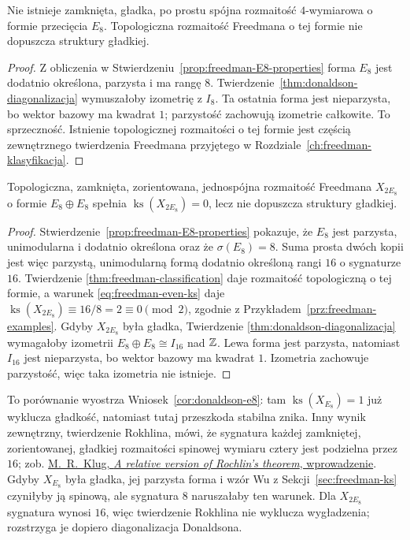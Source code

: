 \begin{wniosek}
\label{cor:donaldson-e8}
Nie istnieje zamknięta, gładka, po prostu spójna
rozmaitość $4$-wymiarowa o formie przecięcia $E_8$.
Topologiczna rozmaitość Freedmana o tej formie
nie dopuszcza struktury gładkiej.
\end{wniosek}
\begin{proof}
Z obliczenia w
Stwierdzeniu~\ref{prop:freedman-E8-properties} forma
$E_8$ jest dodatnio określona, parzysta i ma rangę $8$.
Twierdzenie~\ref{thm:donaldson-diagonalizacja}
wymuszałoby izometrię z $I_8$. Ta ostatnia forma
jest nieparzysta, bo wektor bazowy ma kwadrat $1$;
parzystość zachowują izometrie całkowite. To sprzeczność.
Istnienie topologicznej rozmaitości o tej formie jest
częścią zewnętrznego twierdzenia Freedmana przyjętego
w Rozdziale~\ref{ch:freedman-klasyfikacja}.
\end{proof}

\begin{wniosek}
\label{cor:donaldson-2e8}
Topologiczna, zamknięta, zorientowana, jednospójna
rozmaitość Freedmana $X_{2E_8}$ o formie
$E_8\oplus E_8$ spełnia $\operatorname{ks}(X_{2E_8})=0$,
lecz nie dopuszcza struktury gładkiej.
\end{wniosek}
\begin{proof}
Stwierdzenie~\ref{prop:freedman-E8-properties}
pokazuje, że $E_8$ jest parzysta, unimodularna
i dodatnio określona oraz że $\sigma(E_8)=8$.
Suma prosta dwóch kopii jest więc parzystą,
unimodularną formą dodatnio określoną rangi $16$
o sygnaturze $16$. Twierdzenie
\ref{thm:freedman-classification} daje rozmaitość
topologiczną o tej formie, a warunek
\eqref{eq:freedman-even-ks} daje
$\operatorname{ks}(X_{2E_8})\equiv16/8=2\equiv0\pmod2$,
zgodnie z Przykładem~\ref{prz:freedman-examples}.
Gdyby $X_{2E_8}$ była gładka, Twierdzenie
\ref{thm:donaldson-diagonalizacja} wymagałoby
izometrii $E_8\oplus E_8\cong I_{16}$ nad $\mathbb{Z}$.
Lewa forma jest parzysta, natomiast $I_{16}$
jest nieparzysta, bo wektor bazowy ma kwadrat $1$.
Izometria zachowuje parzystość, więc taka
izometria nie istnieje.
\end{proof}

To porównanie wyostrza Wniosek~\ref{cor:donaldson-e8}:
tam $\operatorname{ks}(X_{E_8})=1$ już wyklucza
gładkość, natomiast tutaj przeszkoda stabilna znika.
Inny wynik zewnętrzny, twierdzenie Rokhlina, mówi,
że sygnatura każdej zamkniętej, zorientowanej,
gładkiej rozmaitości spinowej wymiaru cztery
jest podzielna przez $16$;
zob. \href{https://arxiv.org/pdf/2011.12418}
{M.~R.~Klug, \emph{A relative version of Rochlin's theorem},
wprowadzenie}. Gdyby $X_{E_8}$ była gładka,
jej parzysta forma i wzór Wu z
Sekcji~\ref{sec:freedman-ks} czyniłyby ją spinową,
ale sygnatura $8$ naruszałaby ten warunek.
Dla $X_{2E_8}$ sygnatura wynosi $16$, więc
twierdzenie Rokhlina nie wyklucza wygładzenia;
rozstrzyga je dopiero diagonalizacja Donaldsona.

